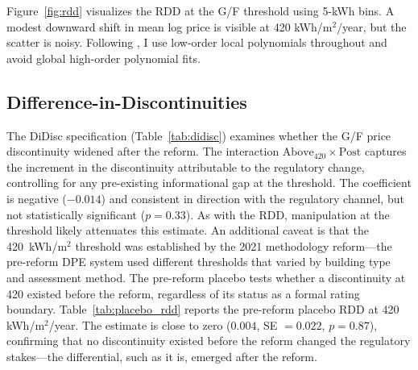 \documentclass[12pt]{article}
\begin{document}
Figure~\ref{fig:rdd} visualizes the RDD at the G/F threshold using 5-kWh bins. A modest downward shift in mean log price is visible at 420 kWh/m$^2$/year, but the scatter is noisy. Following \citet{gelman2019bandwidth}, I use low-order local polynomials throughout and avoid global high-order polynomial fits.

\subsection{Difference-in-Discontinuities}



The DiDisc specification (Table~\ref{tab:didisc}) examines whether the G/F price discontinuity widened after the reform. The interaction $\text{Above}_{420} \times \text{Post}$ captures the increment in the discontinuity attributable to the regulatory change, controlling for any pre-existing informational gap at the threshold. The coefficient is negative ($-0.014$) and consistent in direction with the regulatory channel, but not statistically significant ($p = 0.33$). As with the RDD, manipulation at the threshold likely attenuates this estimate. An additional caveat is that the 420~kWh/m$^2$ threshold was established by the 2021 methodology reform---the pre-reform DPE system used different thresholds that varied by building type and assessment method. The pre-reform placebo tests whether a discontinuity at 420 existed before the reform, regardless of its status as a formal rating boundary. Table~\ref{tab:placebo_rdd} reports the pre-reform placebo RDD at 420 kWh/m$^2$/year. The estimate is close to zero ($0.004$, SE $= 0.022$, $p = 0.87$), confirming that no discontinuity existed before the reform changed the regulatory stakes---the differential, such as it is, emerged after the reform.
\end{document}
